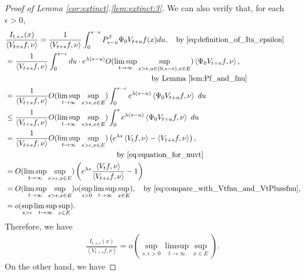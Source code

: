 \documentclass[12pt,a4paper]{amsart}
\numberwithin{equation}{section}
\theoremstyle{plain}
\theoremstyle{definition}
\begin{document}
\begin{proof}[Proof of Lemma \ref{cor:extinct}.\eqref{lem:extinct:3}]
We can also verify that, for each $\epsilon > 0$,
\begin{align}
&\frac{I_{t,s,\epsilon}(x)}{\left\langle V_{t+s}f,\nu \right\rangle} 
= \frac{1}{\left\langle V_{t+s}f,\nu \right\rangle }  \int_0^{s-\epsilon} P_{s-u}^\beta \Psi_0 V_{t+u}f(x) du,\quad\text{by~\eqref{eq:definition_of_Its_epsilon}} 
\\& \begin{multlined}
= \frac{1}{\left\langle V_{t+s}f,\nu \right\rangle}  \int_0^{s-\epsilon} du \cdot e^{\lambda (s- u)} O(\limsup_{t\to \infty}\sup_{s > \epsilon, u\in (0, s-\epsilon), x\in E}) \left\langle \Psi_0 V_{t+u}f,\nu \right\rangle ,
\\\quad\text{by~Lemma \ref{lem:Pf_and_fnu}} 
\end{multlined}
\\& = \frac{1}{\left\langle V_{t+s}f,\nu \right\rangle} O(\limsup_{t\to \infty}\sup_{s > \epsilon, x\in E}) \int_0^{s-\epsilon} e^{\lambda (s- u)}  \left\langle \Psi_0 V_{t+u}f,\nu \right\rangle ~du
\\& \leq \frac{1}{\left\langle V_{t+s}f,\nu \right\rangle} O(\limsup_{t\to \infty}\sup_{s > \epsilon, x\in E}) \int_0^{s} e^{\lambda (s- u)}  \left\langle \Psi_0 V_{t+u}f,\nu \right\rangle ~ du 
\\& \begin{multlined}
= \frac{1}{\left\langle V_{t+s}f,\nu \right\rangle} O(\limsup_{t\to \infty}\sup_{s > \epsilon, x\in E}) \left( e^{\lambda s} \left\langle V_tf,\nu \right\rangle - \left\langle V_{t+s}f,\nu \right\rangle \right),\\\quad\text{by~\eqref{eq:equation_for_nuvt}}
\end{multlined}
\\& =O(\limsup_{t\to \infty}\sup_{s > \epsilon, x\in E}) \left( e^{\lambda s}\frac{ \left\langle V_tf,\nu \right\rangle }{\left \langle V_{t+s}f,\nu \right\rangle}- 1 \right) 
  \\& = O(\limsup_{t\to \infty}\sup_{s > \epsilon,x\in E}) o(\sup_{s>0}\limsup_{t\to \infty} \sup_{x\in E}),
\quad\text{by~\eqref{eq:compare_with_Vtfnu_and_VtPlussfnu},}
\\&= o(\sup_{s>\epsilon}\limsup_{t\to \infty} \sup_{x\in E}) .
\end{align}
Therefore, we have
\begin{align}
  \frac{I_{t,s,\epsilon}(x)}{\left\langle V_{t+s}f,\nu \right\rangle} 
= o(\sup_{s, \epsilon >0} \limsup_{t\to \infty}\sup_{x\in E}).
  \label{eq:10}
\end{align}
On the other hand, we have

\end{proof}
\end{document}
